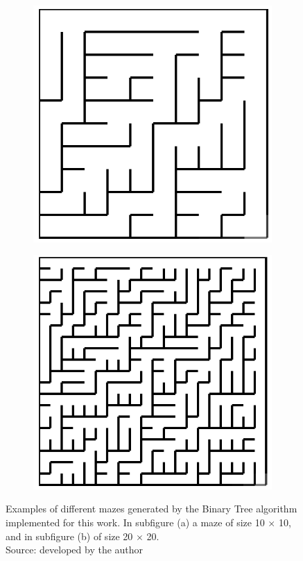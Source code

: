 \begin{figure}[!h]
	\centering
	\begin{subfigure}{.45\textwidth}
	  \centering
	  \includegraphics[width=.6\linewidth]{binary1010}
	  \caption{}
	  \label{fig:sub1}
	\end{subfigure}
	\begin{subfigure}{.45\textwidth}
	  \centering
	  \includegraphics[width=.6\linewidth]{binary2020}
	  \caption{}
	  \label{fig:sub2}
	\end{subfigure}
	\caption{Examples of different mazes generated by the Binary Tree algorithm implemented for this work. In subfigure (a) a maze of size 10 $\times$ 10, and in subfigure (b) of size 20 $\times$ 20.\\ Source: developed by the author}
	\label{fig:test}
	\end{figure}
\newline
\\
\\
\\
\newpage
